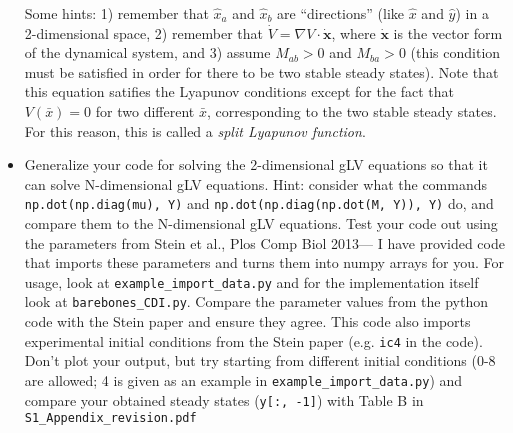 \documentclass[]{article}
\begin{document}
\begin{itemize}
  Some hints: 1) remember that \(\hat{x}_a\) and \(\hat{x}_b\) are
  ``directions'' (like \(\hat{x}\) and \(\hat{y}\)) in a 2-dimensional
  space, 2) remember that \(\dot{V} = \nabla V \cdot \dot{\textbf{x}}\),
  where \(\dot{\textbf{x}}\) is the vector form of the dynamical system,
  and 3) assume \(M_{ab} > 0\) and \(M_{ba} >  0\) (this condition must
  be satisfied in order for there to be two stable steady states). Note
  that this equation satifies the Lyapunov conditions except for the
  fact that \(V(\bar{x}) = 0\) for two different \(\bar{x}\),
  corresponding to the two stable steady states. For this reason, this
  is called a \textit{split Lyapunov function}.
\item
  Generalize your code for solving the 2-dimensional gLV equations so
  that it can solve N-dimensional gLV equations. Hint: consider what the
  commands \texttt{np.dot(np.diag(mu), Y)} and
  \texttt{np.dot(np.diag(np.dot(M, Y)), Y)} do, and compare them to the
  N-dimensional gLV equations. Test your code out using the parameters
  from Stein et al., Plos Comp Biol 2013--- I have provided code that
  imports these parameters and turns them into numpy arrays for you. For
  usage, look at \texttt{example\_import\_data.py} and for the
  implementation itself look at \texttt{barebones\_CDI.py}. Compare the
  parameter values from the python code with the Stein paper and ensure
  they agree. This code also imports experimental initial conditions
  from the Stein paper (e.g. \texttt{ic4} in the code). Don't plot your
  output, but try starting from different initial conditions (0-8 are
  allowed; 4 is given as an example in
  \texttt{example\_import\_data.py}) and compare your obtained steady
  states (\texttt{y[:, -1]}) with Table B in
  \texttt{S1\_Appendix\_revision.pdf}
\end{itemize}
\end{document}
